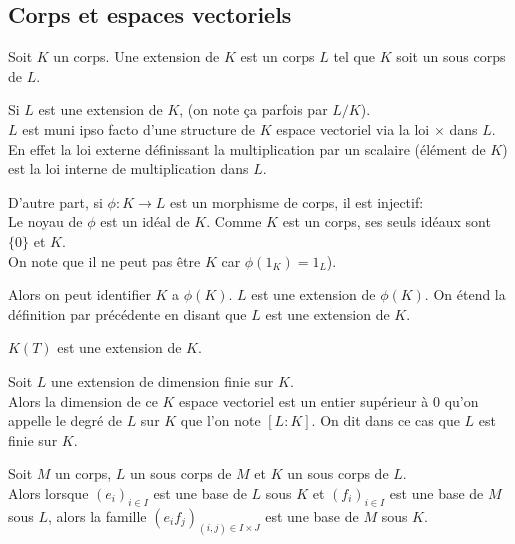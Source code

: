 \subsection{Corps et espaces vectoriels}


\begin{definition}
	Soit $K$ un corps. Une extension de $K$ est un corps $L$ tel que $K$ soit un sous corps de $L$.
\end{definition}


\begin{remarque}
	Si $L$ est une extension de $K$, (on note ça parfois par $L/K$).\\
	$L$ est muni ipso facto d'une structure de $K$ espace vectoriel via la loi $\times$ dans $L$.\\
	En effet la loi externe définissant la multiplication par un scalaire (élément de $K$) est la loi interne de multiplication dans $L$.

	D'autre part, si $\phi : K \to L$ est un morphisme de corps, il est injectif: \\
	Le noyau de $\phi$ est un idéal de $K$. Comme $K$ est un corps, ses seuls idéaux sont $\{0\}$ et $K$.\\
	On note que il ne peut pas être $K$ car $\phi(1_K) = 1_L$).

	Alors on peut identifier $K$ a $\phi(K)$. $L$ est une extension de $\phi(K)$. On étend la définition par précédente en disant que $L$ est une extension de $K$.
\end{remarque}

\begin{example}
	$K(T)$ est une extension de $K$.
\end{example}

\begin{definition}
	Soit $L$ une extension de dimension finie sur $K$.\\
	Alors la dimension de ce $K$ espace vectoriel est un entier supérieur à 0 qu'on appelle
	le degré de $L$ sur $K$ que l'on note $[L : K]$. On dit dans ce cas que $L$ est finie sur $K$.
\end{definition}

\begin{theorem}
	Soit $M$ un corps, $L$ un sous corps de $M$ et $K$ un sous corps de $L$.\\
	Alors lorsque $(e_i)_{i\in I}$ est une base de $L$ sous $K$ et $(f_i)_{i\in I}$ est une base de $M$ sous $L$, alors la famille
	$(e_if_j)_{(i,j)\in I\times J}$ est une base de $M$ sous $K$.
\end{theorem}


